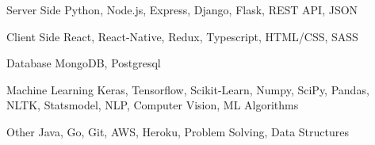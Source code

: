 

\begin{cvskills}

  \cvskill
    {Server Side}
    {Python, Node.js, Express, Django, Flask, REST API, JSON}
    
  \cvskill
    {Client Side}
    {React, React-Native, Redux, Typescript, HTML/CSS, SASS}
    
  \cvskill
    {Database}
    {MongoDB, Postgresql}
    
  \cvskill
    {Machine Learning}
    {Keras, Tensorflow, Scikit-Learn, Numpy, SciPy, Pandas, NLTK, Statsmodel, NLP, Computer Vision, ML Algorithms}

  \cvskill
    {Other}
    {Java, Go, Git, AWS, Heroku, Problem Solving, Data Structures}

\end{cvskills}